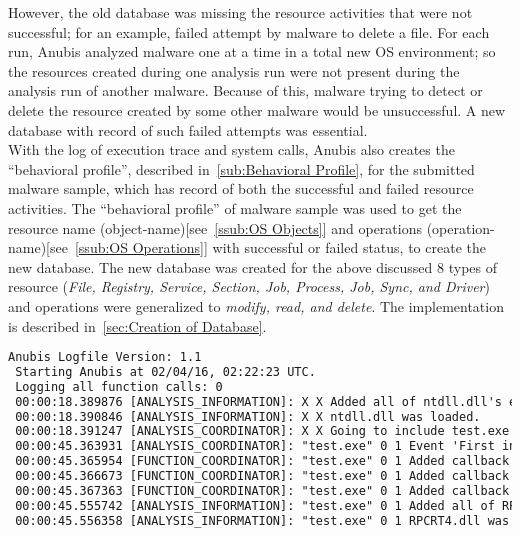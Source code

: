 However, the old database was missing the resource activities that were not successful; for an example, failed attempt by malware to delete a file.
For each run, Anubis analyzed malware one at a time in a total new OS environment; so the resources created during one analysis run were not present during the analysis run of another malware.
Because of this, malware trying to detect or delete the resource created by some other malware would be unsuccessful.
A new database with record of such failed attempts was essential.\\

With the log of execution trace and system calls, Anubis also creates the ``behavioral profile'', described in~\autoref{sub:Behavioral Profile}, for the submitted malware sample, which has record of both the successful and failed resource activities.
The ``behavioral profile'' of malware sample was used to get the resource name (object-name)[see~\autoref{ssub:OS Objects}] and operations (operation-name)[see~\autoref{ssub:OS Operations}] with successful or failed status, to create the new database.
The new database was created for the above discussed 8 types of resource (\emph{File, Registry, Service, Section, Job, Process, Job, Sync, and Driver}) and operations were generalized to \emph{modify, read, and delete}.
The implementation is described in~\autoref{sec:Creation of Database}.
\begin{lstlisting}[float,floatplacement=ht,language=TeX,caption={Snippet of Anubis Log},label={lst:anubislog}]
 Anubis Logfile Version: 1.1
 Starting Anubis at 02/04/16, 02:22:23 UTC.
 Logging all function calls: 0
 00:00:18.389876 [ANALYSIS_INFORMATION]: X X Added all of ntdll.dll's exported functions to the function Addresses Map.
 00:00:18.390846 [ANALYSIS_INFORMATION]: X X ntdll.dll was loaded.
 00:00:18.391247 [ANALYSIS_COORDINATOR]: X X Going to include test.exe with PDB 0x04660000 in the analysis.
 00:00:45.363931 [ANALYSIS_COORDINATOR]: "test.exe" 0 1 Event 'First instruction of the process' happened.
 00:00:45.365954 [FUNCTION_COORDINATOR]: "test.exe" 0 1 Added callback for function NtOpenKey (7C90D5B0)
 00:00:45.366673 [FUNCTION_COORDINATOR]: "test.exe" 0 1 Added callback for function NtDeleteKey (7C90D230)
 00:00:45.367363 [FUNCTION_COORDINATOR]: "test.exe" 0 1 Added callback for function NtCreateKey (7C90D0D0)
 00:00:45.555742 [ANALYSIS_INFORMATION]: "test.exe" 0 1 Added all of RPCRT4.dll's exported functions to the function Addresses Map.
 00:00:45.556358 [ANALYSIS_INFORMATION]: "test.exe" 0 1 RPCRT4.dll was loaded.
\end{lstlisting}
